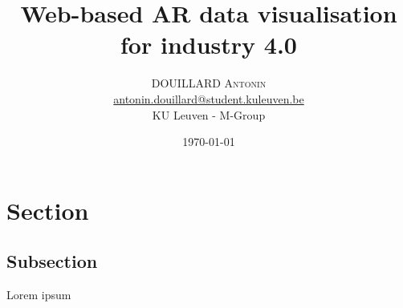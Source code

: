 \documentclass[twoside,twocolumn]{article}
\title{Web-based AR data visualisation for industry 4.0} %
\author{\textsc{DOUILLARD Antonin}\\
\normalsize \href{mailto:antonin.douillard@student.kuleuven.be}{antonin.douillard@student.kuleuven.be} %
\vspace{0.4cm}\\
\normalsize KU Leuven - M-Group\\ %
}
\date{\today} %
\begin{document}
\maketitle


\section{Section}

\subsection{Subsection}

Lorem ipsum


\printbibliography
\end{document}
